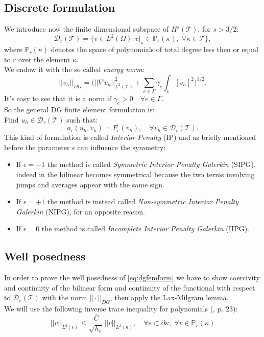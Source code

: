 \documentclass[12pt, a4paper]{article}
\theoremstyle{definition}
\theoremstyle{plain}
\theoremstyle{plain}
\begin{document}
\subsection{Discrete formulation}
We introduce now the finite dimensional subspace of $H^s(\mathcal{T})$, for $s>3/2$:
\begin{equation} \label{eq:dgspace}
	\mathcal{D}_r(\mathcal{T}) = \{ v \in L^2(\Omega) : v|_\kappa \in \mathbb{P}_r(\kappa), \; \forall \kappa \in \mathcal{T}  \},
\end{equation}
where $\mathbb{P}_r(\kappa)$ denotes the space of polynomials of total degree less then or equal to $r$ over the element $\kappa$.\\
We endow it with the so called \textit{energy norm}:
\begin{equation*}
	|\!|v_h|\!|_{DG} = \bigg( |\!|\nabla v_h|\!|^2_{L^2(\mathcal{T})} + \sum_{e \in \Gamma} \gamma_e \int_e [v_h]^2 \bigg)^{1/2}.
\end{equation*}
It's easy to see that it is a norm if $\gamma_e > 0 \quad \forall e \in \Gamma$.\\
So the general DG finite element formulation is:\\
Find $u_h \in \mathcal{D}_r(\mathcal{T})$ such that:
\begin{equation} \label{eq:dgfemform}
	a_\epsilon(u_h, v_h) = F_\epsilon(v_h), \quad \forall v_h \in \mathcal{D}_r(\mathcal{T}).
\end{equation}
This kind of formulation is called \textit{Interior Penalty} (IP) and as briefly mentioned before the parameter $\epsilon$ can influence the symmetry:
\begin{itemize}
\item
If $\epsilon = -1$ the method is called \textit{Symmetric Interior Penalty Galerkin} (SIPG), indeed in the bilinear becomes symmetrical because the two terms involving jumps and averages appear with the same sign.
\item
If  $\epsilon = +1$ the method is instead called \textit{Non-symmetric Interior Penalty Galerkin} (NIPG), for an opposite reason.
\item
If $\epsilon = 0$ the method is called \textit{Incomplete Interior Penalty Galerkin} (IIPG).
\end{itemize}
\subsection{Well posedness}
In order to prove the well posedness of \eqref{eq:dgfemform} we have to show coercivity and continuity of the bilinear form and continuity of the functional with respect to $\mathcal{D}_r(\mathcal{T})$ with the norm $||\cdot||_{DG}$, then apply the Lax-Milgram lemma.\\
We will use the following inverse trace inequality for polynomials (\cite{riviere}, p. 23):
\begin{equation} \label{eq:trineq}
	|\!|v|\!|_{L^2(e)} \leq \frac{\bar{C}}{\sqrt{h_\kappa}} |\!|v|\!|_{L^2(\kappa)}, \quad \forall e \subset \partial \kappa, \; \forall v \in \mathbb{P}_r(\kappa)
\end{equation}
\end{document}
